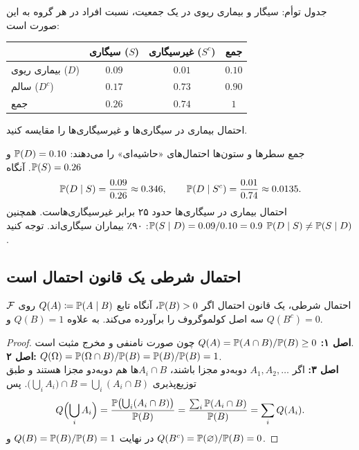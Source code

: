 \begin{example}[label=ex:table]{جدول توأم: سیگار و بیماری ریوی}
در یک جمعیت، نسبت افراد در هر گروه به این صورت است:
\begin{center}
\renewcommand{\arraystretch}{1.3}
\begin{tabular}{l|cc|c}
 & سیگاری ($S$) & غیرسیگاری ($S^c$) & جمع\\\hline
بیماری ریوی ($D$) & $0.09$ & $0.01$ & $0.10$\\
سالم ($D^c$) & $0.17$ & $0.73$ & $0.90$\\\hline
جمع & $0.26$ & $0.74$ & $1$
\end{tabular}
\end{center}
احتمال بیماری در سیگاری‌ها و غیرسیگاری‌ها را مقایسه کنید.
\begin{solution}
جمع سطرها و ستون‌ها احتمال‌های «حاشیه‌ای» را می‌دهند: $\P(D)=0.10$ و $\P(S)=0.26$. آنگاه
\[ \P(D\mid S)=\frac{0.09}{0.26}\approx0.346,\qquad \P(D\mid S^c)=\frac{0.01}{0.74}\approx0.0135. \]
احتمال بیماری در سیگاری‌ها حدود ۲۵ برابر غیرسیگاری‌هاست. همچنین $\P(S\mid D)=0.09/0.10=0.9$: ۹۰٪ بیماران سیگاری‌اند. توجه کنید $\P(D\mid S)\ne\P(S\mid D)$.
\end{solution}
\end{example}

\subsection{احتمال شرطی یک قانون احتمال است}

\begin{theorem}[label=thm:cond-is-prob]{احتمال شرطی، یک قانون احتمال}
اگر $\P(B)>0$، آنگاه تابع $Q(A)\defeq\P(A\mid B)$ روی $\F$ سه اصل کولموگروف را برآورده می‌کند. به علاوه $Q(B)=1$ و $Q(B^c)=0$.
\end{theorem}

\begin{proof}
\textbf{اصل ۱:} $Q(A)=\P(A\cap B)/\P(B)\ge0$ چون صورت نامنفی و مخرج مثبت است.\\
\textbf{اصل ۲:} $Q(\Omega)=\P(\Omega\cap B)/\P(B)=\P(B)/\P(B)=1$.\\
\textbf{اصل ۳:} اگر $A_1,A_2,\dots$ دوبه‌دو مجزا باشند، $A_i\cap B$ها هم دوبه‌دو مجزا هستند و طبق توزیع‌پذیری $\bigl(\bigcup_iA_i\bigr)\cap B=\bigcup_i(A_i\cap B)$. پس
\[ Q\Bigl(\bigcup_iA_i\Bigr)=\frac{\P\bigl(\bigcup_i(A_i\cap B)\bigr)}{\P(B)}=\frac{\sum_i\P(A_i\cap B)}{\P(B)}=\sum_iQ(A_i). \]
در نهایت $Q(B)=\P(B)/\P(B)=1$ و $Q(B^c)=\P(\varnothing)/\P(B)=0$.
\end{proof}

